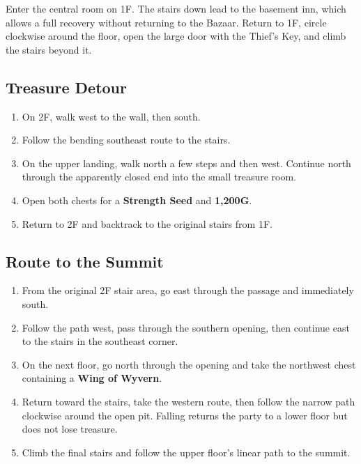 \documentclass[
  american,
  10pt,
  letterpaper,
  oneside,
  open=any]{scrreprt}
\providecommand{\tightlist}{%
  \setlength{\itemsep}{0pt}\setlength{\parskip}{0pt}}
\begin{document}
Enter the central room on 1F. The stairs down lead to the basement inn,
which allows a full recovery without returning to the Bazaar. Return to
1F, circle clockwise around the floor, open the large door with the
Thief's Key, and climb the stairs beyond it.

\subsection{Treasure Detour}\label{treasure-detour}

\begin{enumerate}
\def\labelenumi{\arabic{enumi}.}
\tightlist
\item
  On 2F, walk west to the wall, then south.
\item
  Follow the bending southeast route to the stairs.
\item
  On the upper landing, walk north a few steps and then west. Continue
  north through the apparently closed end into the small treasure room.
\item
  Open both chests for a \textbf{Strength Seed} and \textbf{1,200G}.
\item
  Return to 2F and backtrack to the original stairs from 1F.
\end{enumerate}

\subsection{Route to the Summit}\label{route-to-the-summit}

\begin{enumerate}
\def\labelenumi{\arabic{enumi}.}
\tightlist
\item
  From the original 2F stair area, go east through the passage and
  immediately south.
\item
  Follow the path west, pass through the southern opening, then continue
  east to the stairs in the southeast corner.
\item
  On the next floor, go north through the opening and take the northwest
  chest containing a \textbf{Wing of Wyvern}.
\item
  Return toward the stairs, take the western route, then follow the
  narrow path clockwise around the open pit. Falling returns the party
  to a lower floor but does not lose treasure.
\item
  Climb the final stairs and follow the upper floor's linear path to the
  summit.
\end{enumerate}
\end{document}
